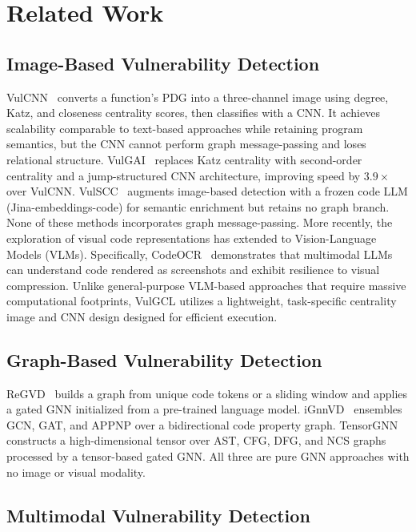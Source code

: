 \section{Related Work}
\label{sec:related_work}

\subsection{Image-Based Vulnerability Detection}

VulCNN~\cite{vulcnn} converts a function's PDG into a three-channel image using
degree, Katz, and closeness centrality scores, then classifies with a CNN.
It achieves scalability comparable to text-based approaches while retaining
program semantics, but the CNN cannot perform graph message-passing and
loses relational structure. VulGAI~\cite{vulgai} replaces Katz centrality with
second-order centrality and a jump-structured CNN architecture, improving speed
by $3.9\times$ over VulCNN. VulSCC~\cite{vulscc} augments image-based detection
with a frozen code LLM (Jina-embeddings-code) for semantic enrichment but
retains no graph branch. None of these methods incorporates graph message-passing.
More recently, the exploration of visual code representations has extended to 
Vision-Language Models (VLMs). Specifically, CodeOCR~\cite{codeocr} demonstrates 
that multimodal LLMs can understand code rendered as screenshots and exhibit 
resilience to visual compression. Unlike general-purpose VLM-based approaches 
that require massive computational footprints, VulGCL utilizes a lightweight, 
task-specific centrality image and CNN design designed for efficient execution.

\subsection{Graph-Based Vulnerability Detection}

ReGVD~\cite{regvd} builds a graph from unique code tokens or a sliding window
and applies a gated GNN initialized from a pre-trained language model.
iGnnVD~\cite{ignnvd} ensembles GCN, GAT, and APPNP over a bidirectional code
property graph. TensorGNN~\cite{tensorgnn} constructs a high-dimensional tensor
over AST, CFG, DFG, and NCS graphs processed by a tensor-based gated GNN.
All three are pure GNN approaches with no image or visual modality.

\subsection{Multimodal Vulnerability Detection}

